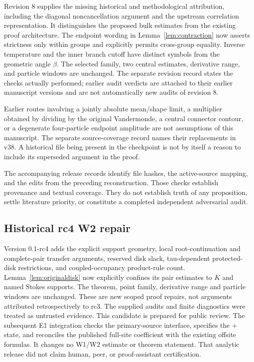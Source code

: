 \documentclass[11pt]{article}
\numberwithin{equation}{section}
\theoremstyle{definition}
\begin{document}
Revision 8 supplies the missing historical and methodological
attribution, including the diagonal noncancellation argument and the
upstream correlation representation. It distinguishes the proposed
bulk estimates from the existing proof architecture. The endpoint
wording in Lemma~\ref{lem:contraction} now asserts strictness only
within groups and explicitly permits cross-group equality. Inverse
temperature and the inner branch cutoff have distinct symbols from
the geometric angle \(\beta\). The selected family, two central
estimates, derivative range, and particle windows are unchanged.
The separate revision record states the checks actually performed;
earlier audit verdicts are attached to their earlier manuscript
versions and are not automatically new audits of revision 8.

Earlier routes involving a jointly absolute mean/shape
limit, a multiplier obtained by dividing by the original
Vandermonde, a central connector contour, or a degenerate
four-particle endpoint amplitude are not assumptions of
this manuscript. The separate source-coverage record names
their replacements in v38. A historical file being
present in the checkpoint is not by itself a reason to
include its superseded argument in the proof.

The accompanying release records identify file hashes, the active-source
mapping, and the edits from the preceding reconstruction.
Those checks establish provenance and textual coverage.
They do not establish truth of any proposition, settle
literature priority, or constitute a completed independent
adversarial audit.


\subsection*{Historical rc4 W2 repair}
Version 0.1-rc4 adds the explicit support geometry,
local root-continuation and complete-pair transfer arguments,
reserved disk slack, tau-dependent protected-disk restrictions,
and coupled-occupancy product-rule count. Lemma~\ref{lem:originaldisk}
now explicitly confines its pair estimates to \(K\) and named
Stokes supports. The theorem, point family, derivative range and
particle windows are unchanged. These are new scoped proof repairs,
not arguments attributed retrospectively to rc3. The supplied
audits and finite diagnostics were treated as untrusted evidence.
This candidate is prepared for public review. The subsequent E1 integration
checks the primary-source interface, specifies the \(+\) state, and
reconciles the published full-site coefficient with the existing
offsite formulas. It changes no W1/W2 estimate or theorem statement.
That analytic release did not claim human, peer, or proof-assistant certification.
\end{document}
